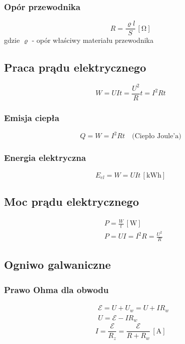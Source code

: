 \documentclass{article}
\numberwithin{equation}{section}
\newcommand{\unit}[1]{\, \left[\mathrm{#1}\right]}
\begin{document}
      \subsubsection{Opór przewodnika}
        \begin{equation}
          R = \frac{\varrho l}{S} \unit{\Omega}
        \end{equation}
      gdzie $\varrho$ - opór właściwy materiału przewodnika
    \subsection{Praca prądu elektrycznego}
      \begin{equation}
        W = UIt = \frac{U^2}{R}t = I^2Rt
      \end{equation}
      \subsubsection{Emisja ciepła}
        \begin{equation}
          Q = W = I^2Rt \quad\text{(Ciepło Joule'a)}
        \end{equation}
      \subsubsection{Energia elektryczna}
        \begin{equation}
          E_{el} = W = UIt \unit{kWh}
        \end{equation}
    \subsection{Moc prądu elektrycznego}
      \begin{align}
        &P = \frac{W}{t} \unit{W}\\
        &P = UI = I^2R = \frac{U^2}{R}
      \end{align}
    \subsection{Ogniwo galwaniczne}
      \subsubsection{Prawo Ohma dla obwodu}
        \begin{align}
          &\mathcal E = U + U_w = U + IR_w\\
          &U = \mathcal E - IR_w
        \end{align}
        \begin{equation}
          I = \frac{\mathcal E}{R_z} = \frac{\mathcal E}{R + R_w} \unit{A}
        \end{equation}
\end{document}
